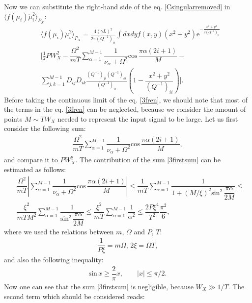 \documentclass{article}
\begin{document}
Now we can substitute the right-hand side of the eq. \eqref{Csingularremoved} in $\langle f(\mu_{i})\dot{\mu}^{2}_{i}\rangle_{P_{X}}$:
\begin{align}\label{3fren}
    &\langle f(\mu_{i}) \dot{\mu}_{i}^{2} \rangle_{P_{X}} =  \frac{4(\gamma L)^{2}}{2\pi (Q^{-1})_{ii}} \int dxdy f(x,y)(x^{2}+y^{2}) \textrm{e}^{-\frac{x^{2}+y^{2}}{2(Q^{-1})_{ii}}} \nonumber \\
    &\Bigg[\frac{1}{2}PW_{X}^{2}-\dfrac{\Omega^{2}}{mT}\sum_{\alpha=1}^{M-1}\dfrac{1}{\nu_{\alpha}+\Omega^{2}}\textrm{cos}\,\dfrac{\pi \alpha(2i+1)}{M}-\nonumber\\
    &\sum_{j,k=1}^{M-1}D_{ij}D_{ik}\frac{(Q^{-1})_{ji}(Q^{-1})_{ki}}{(Q^{-1})_{ii}}\left(1-\dfrac{x^{2}+y^{2}}{(Q^{-1})_{ii}}\right)\Bigg].
\end{align}
Before taking the continuous limit of the eq$.$ \eqref{3fren}, we should note that most of the terms in the eq$.$ \eqref{3fren} can be neglected, because we consider the amount of points $M \sim T W_{X}$ needed to represent the input signal to be large. Let us first consider the following sum:
\begin{align}\label{3firstsum}
    \dfrac{\Omega^{2}}{mT}\sum_{\alpha=1}^{M-1}\dfrac{1}{\nu_{\alpha}+\Omega^{2}}\textrm{cos}\,\dfrac{\pi \alpha(2i+1)}{M},
\end{align}
and compare it to $PW_{X}^{2}$. The contribution of the sum \eqref{3firstsum} can be estimated as follows:
\begin{align}
    &\dfrac{\Omega^{2}}{mT}\left|\sum_{\alpha=1}^{M-1}\dfrac{1}{\nu_{\alpha}+\Omega^{2}}\textrm{cos}\,\dfrac{\pi \alpha(2i+1)}{M}\right| \leq \dfrac{1}{mT}\sum_{\alpha=1}^{M-1} \dfrac{1}{1+(M/\xi)^{2}\textrm{sin}^{2}\,\dfrac{\pi \alpha}{2M}}\leq\nonumber\\ 
    & \dfrac{\xi^{2}}{m T M^{2}}\sum_{\alpha=1}^{M-1} \dfrac{1}{\textrm{sin}^{2}\,\dfrac{\pi \alpha}{2M}} \leq \dfrac{\xi^{2}}{m T}\sum_{\alpha=1}^{M-1}\dfrac{1}{\alpha^{2}} \leq \dfrac{2P \xi^{4}}{T^{2}}\dfrac{\pi^{2}}{6},
\end{align}
where we used the relations between $m$, $\Omega$ and $P$, $T$:
\begin{align}\label{3momegaPTrelations}
    \dfrac{1}{P\xi} = m\Omega, \, 2\xi = \Omega T,
\end{align}
and also the following inequality:
\begin{align}
    \textrm{sin}\,x \geq \dfrac{2}{\pi}x, \qquad |x| \leq \pi/2.
\end{align}
Now one can see that the sum \eqref{3firstsum} is negligible, because $W_{X} \gg 1/T$. The second term which should be considered reads:
\end{document}
